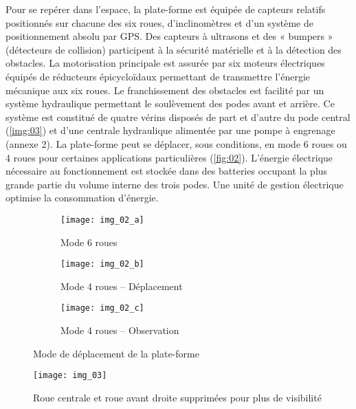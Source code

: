 Pour se repérer dans l’espace, la plate-forme est équipée de capteurs relatifs positionnés sur chacune des six roues, d’inclinomètres et d’un système de positionnement absolu par GPS. Des capteurs à ultrasons et des « bumpers » (détecteurs de collision) participent à la sécurité matérielle et à la détection des obstacles.
La motorisation principale est assurée par six moteurs électriques équipés de réducteurs épicycloïdaux permettant de transmettre l’énergie mécanique aux six roues. Le franchissement des obstacles est facilité par un système hydraulique permettant le soulèvement des podes avant et arrière. Ce système est constitué de quatre vérins disposés de part et d’autre du pode central (\autoref{img:03}) et d’une centrale hydraulique alimentée par une pompe à engrenage (annexe 2). La plate-forme peut se déplacer, sous conditions, en mode 6 roues ou 4 roues pour certaines applications particulières (\autoref{fig:02}). L’énergie électrique nécessaire au fonctionnement est stockée dans des batteries occupant la plus grande partie du volume interne des trois podes. Une unité de gestion électrique optimise la consommation d’énergie. 

\begin{figure}[H]
\centering
\begin{subfigure}{0.27\textwidth}
    \texttt{[image: img\_02\_a]}
    \caption{Mode 6 roues}
    \label{fig:02a}
\end{subfigure} \hfill
\begin{subfigure}{0.27\textwidth}
    \texttt{[image: img\_02\_b]}
    \caption{Mode 4 roues -- Déplacement}
    \label{fig:02a}
\end{subfigure} \hfill
\begin{subfigure}{0.27\textwidth}
    \texttt{[image: img\_02\_c]}
    \caption{Mode 4 roues -- Observation}
    \label{fig:02a}
\end{subfigure}\caption{Mode de déplacement de la plate-forme \label{fig:02}}
\end{figure}


\begin{figure}[H]
\centering
\texttt{[image: img\_03]}
\caption{Roue centrale et roue avant droite supprimées pour plus de visibilité \label{img:03}}
\end{figure}

